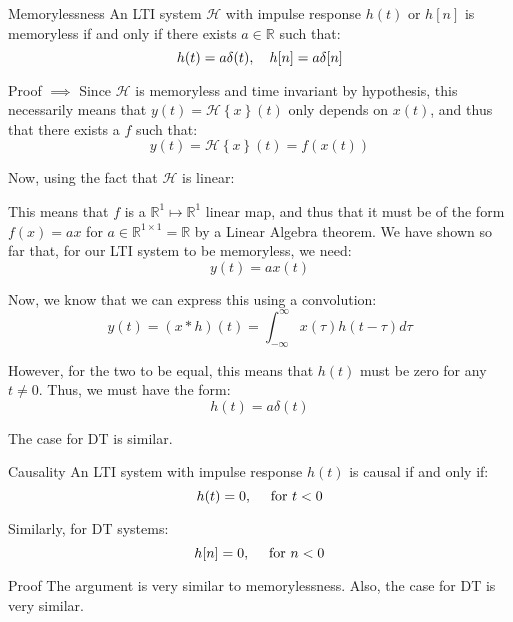 \documentclass[a4paper]{article}
\begin{document}
\begin{parag}{Memorylessness}
    An LTI system $\mathcal{H}$ with impulse response $h\left(t\right)$ or $h\left[n\right]$ is memoryless if and only if there exists $a \in \mathbb{R}$ such that:
    \[h\left(t\right) = a \delta\left(t\right), \mathspace h\left[n\right] = a \delta \left[n\right]\]
    
    \begin{subparag}{Proof $\implies$}
        Since $\mathcal{H}$ is memoryless and time invariant by hypothesis, this necessarily means that $y\left(t\right) = \mathcal{H}\left\{x\right\}\left(t\right)$ only depends on $x\left(t\right)$, and thus that there exists a $f$ such that: 
        \[y\left(t\right) = \mathcal{H}\left\{x\right\}\left(t\right) = f\left(x\left(t\right)\right)\]

        Now, using the fact that $\mathcal{H}$ is linear:
        
        This means that $f$ is a $\mathbb{R}^1 \mapsto \mathbb{R}^1$ linear map, and thus that it must be of the form $f\left(x\right) = ax$ for $a \in \mathbb{R}^{1 \times 1} = \mathbb{R}$ by a Linear Algebra theorem. We have shown so far that, for our LTI system to be memoryless, we need:
        \[y\left(t\right) = ax\left(t\right)\]
        
        Now, we know that we can express this using a convolution: 
        \[y\left(t\right) = \left(x * h\right)\left(t\right) = \int_{-\infty}^{\infty} x\left(\tau\right)h\left(t - \tau\right) d\tau\]
        
        However, for the two to be equal, this means that $h\left(t\right)$ must be zero for any $t \neq 0$. Thus, we must have the form: 
        \[h\left(t\right) = a \delta\left(t\right)\]

        The case for DT is similar.
    \end{subparag}
\end{parag}

\begin{parag}{Causality}
    An LTI system with impulse response $h\left(t\right)$ is causal if and only if:
    \[h\left(t\right) = 0, \mathspace \text{ for } t <0\]

    Similarly, for DT systems:
    \[h\left[n\right] = 0, \mathspace \text{ for } n <0\]
    
    \begin{subparag}{Proof}
        The argument is very similar to memorylessness. Also, the case for DT is very similar.
    \end{subparag}
\end{parag}
\end{document}
